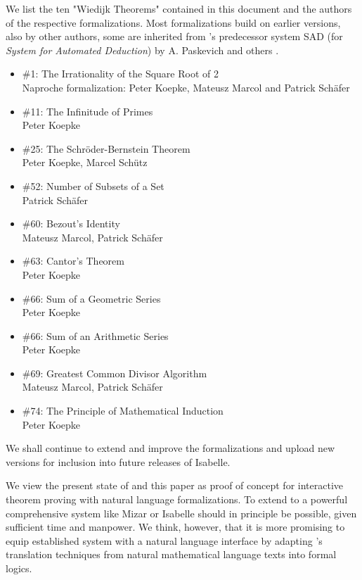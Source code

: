 \documentclass{article}
\begin{document}
We list the ten "Wiedijk Theorems" contained in this document and
the authors of the respective formalizations. Most formalizations build on
earlier versions, also by other authors, some are inherited from
\Naproche's predecessor system
SAD (for \emph{System for Automated Deduction}) by A. Paskevich
and others \cite{SAD}.
\begin{itemize}
\item \#1: The Irrationality of the Square Root of 2\\
Naproche formalization: Peter Koepke, Mateusz Marcol and Patrick Schäfer
\item \#11: The Infinitude of Primes\\
Peter Koepke
\item \#25: The Schröder-Bernstein Theorem\\
Peter Koepke, Marcel Schütz
\item \#52: Number of Subsets of a Set\\
Patrick Schäfer
\item \#60: Bezout's Identity\\
Mateusz Marcol, Patrick Schäfer
\item \#63: Cantor's Theorem\\
Peter Koepke
\item \#66: Sum of a Geometric Series\\
Peter Koepke
\item \#66: Sum of an Arithmetic Series\\
Peter Koepke
\item \#69: Greatest Common Divisor Algorithm\\
Mateusz Marcol, Patrick Schäfer
\item \#74: The Principle of Mathematical Induction\\
Peter Koepke
\end{itemize}
We shall continue to extend and improve the formalizations and upload
new versions for inclusion into future releases of Isabelle.

We view the present state of \Naproche{} and this paper as proof of
concept for interactive theorem
proving with natural language formalizations.
To extend \Naproche{} to a powerful comprehensive
system like Mizar or Isabelle should in principle be possible,
given sufficient time and manpower.
We think, however, that it is more promising to equip established
system with a natural language interface by adapting
\Naproche's translation techniques
from natural mathematical language texts into formal logics.
\end{document}

